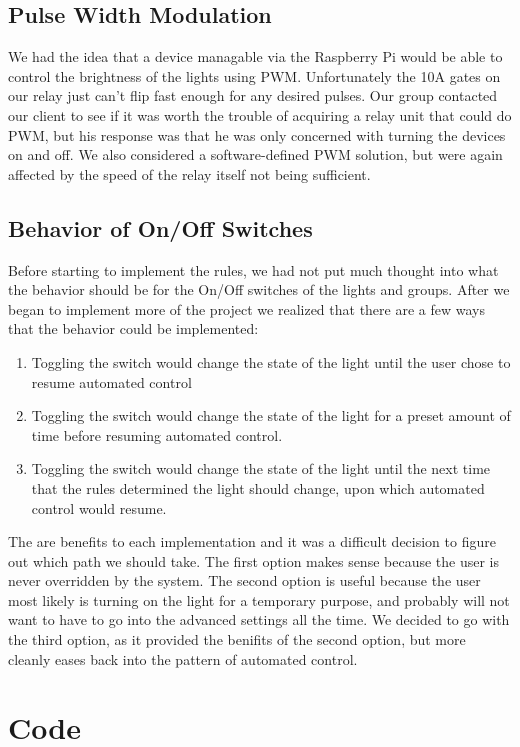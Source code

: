 \documentclass[oneside,openright]{book}
\begin{document}
\subsection{Pulse Width Modulation}
We had the idea that a device managable via the Raspberry Pi would be able to control the brightness of the lights using PWM. Unfortunately the 10A gates on our relay just can't flip fast enough for any desired pulses. Our group contacted our client to see if it was worth the trouble of acquiring a relay unit that could do PWM, but his response was that he was only concerned with turning the devices on and off. We also considered a software-defined PWM solution, but were again affected by the speed of the relay itself not being sufficient.

\subsection{Behavior of On/Off Switches}
Before starting to implement the rules, we had not put much thought into what the behavior should be for the On/Off switches of the lights and groups. After we began to implement more of the project we realized that there are a few ways that the behavior could be implemented:
\begin{enumerate}
  \item Toggling the switch would change the state of the light until the user chose to resume automated control
  \item Toggling the switch would change the state of the light for a preset amount of time before resuming automated control.
  \item Toggling the switch would change the state of the light until the next time that the rules determined the light should change, upon which automated control would resume.
\end{enumerate}
The are benefits to each implementation and it was a difficult decision to figure out which path we should take. The first option makes sense because the user is never overridden by the system. The second option is useful because the user most likely is turning on the light for a temporary purpose, and probably will not want to have to go into the advanced settings all the time. We decided to go with the third option, as it provided the benifits of the second option, but more cleanly eases back into the pattern of automated control.

\section{Code}
\end{document}
